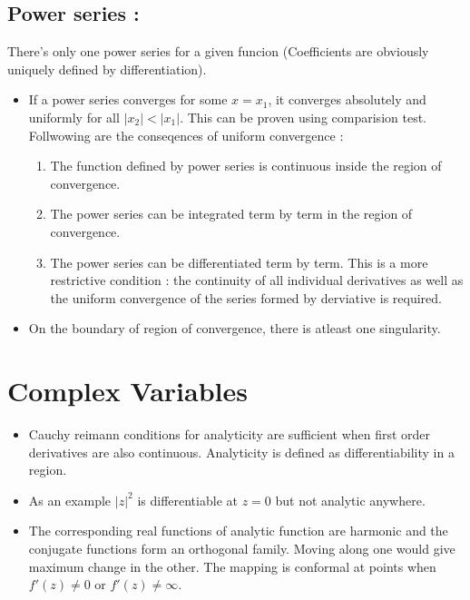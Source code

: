 \documentclass{report}
\begin{document}
\section{Power series :}

There's only one power series for a given funcion (Coefficients are obviously uniquely defined by differentiation).

\begin{itemize}

  \item If a power series converges for some $x=x_1$, it converges absolutely and uniformly for all $|x_2| < |x_1|$. This can be proven using comparision test.\\

    Follwowing are the conseqences of uniform convergence :

    \begin{enumerate}
      \item The function defined by power series is continuous inside the region of convergence. 

      \item The power series can be integrated term by term in the region of convergence.

      \item The power series can be differentiated term by term. This is a more restrictive condition : the continuity of all individual derivatives as well as  the uniform convergence of the series formed by derviative is required.

    \end{enumerate}

  \item On the boundary of region of convergence, there is atleast one singularity.

\end{itemize}

\chapter{Complex Variables}

\begin{itemize}

  \item Cauchy reimann conditions for analyticity are sufficient when first order derivatives are also continuous. Analyticity is defined as differentiability in a region. 

  \item As an example $|z|^2$ is differentiable at $z=0$ but not analytic anywhere.

  \item The corresponding real functions of analytic function are harmonic and the conjugate functions form an orthogonal family. Moving along one would give maximum change in the other. The mapping is conformal at points when $f'(z) \neq 0$ or $f'(z) \neq \infty$.

\end{itemize}
\end{document}

